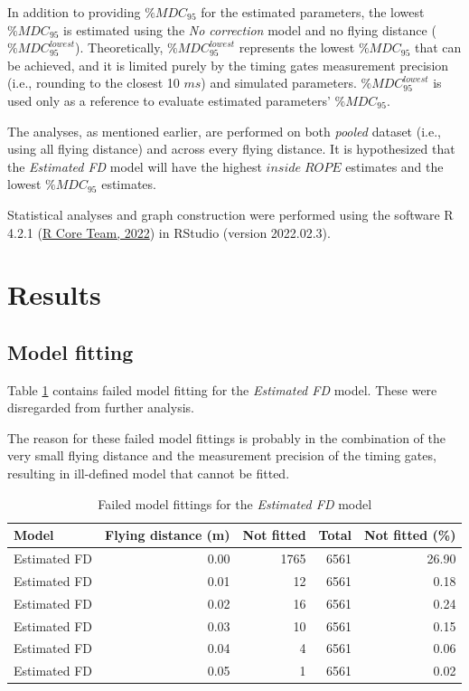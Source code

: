 \documentclass[fleqn,10pt]{wlpeerj} %
\begin{document}
In addition to providing \(\%MDC_{95}\) for the estimated parameters, the lowest \(\%MDC_{95}\) is estimated using the \emph{No correction} model and no flying distance (\(\%MDC_{95}^{lowest}\)). Theoretically, \(\%MDC_{95}^{lowest}\) represents the lowest \(\%MDC_{95}\) that can be achieved, and it is limited purely by the timing gates measurement precision (i.e., rounding to the closest 10 \(ms\)) and simulated parameters. \(\%MDC_{95}^{lowest}\) is used only as a reference to evaluate estimated parameters' \(\%MDC_{95}\).

The analyses, as mentioned earlier, are performed on both \emph{pooled} dataset (i.e., using all flying distance) and across every flying distance. It is hypothesized that the \emph{Estimated FD} model will have the highest \(inside \; ROPE\) estimates and the lowest \(\%MDC_{95}\) estimates.

Statistical analyses and graph construction were performed using the software R 4.2.1 (\protect\hyperlink{ref-R-base}{R Core Team, 2022}) in RStudio (version 2022.02.3).

\hypertarget{results}{%
\section{Results}\label{results}}

\hypertarget{model-fitting}{%
\subsection{Model fitting}\label{model-fitting}}

Table \ref{tab:tbl-not-fitted} contains failed model fitting for the \emph{Estimated FD} model. These were disregarded from further analysis.

The reason for these failed model fittings is probably in the combination of the very small flying distance and the measurement precision of the timing gates, resulting in ill-defined model that cannot be fitted.



\begin{table}

\caption{\label{tab:tbl-not-fitted}Failed model fittings for the \emph{Estimated FD} model}
\centering
\begin{tabular}[t]{lrrrr}
\toprule
Model & Flying distance (m) & Not fitted & Total & Not fitted (\%)\\
\midrule
Estimated FD & 0.00 & 1765 & 6561 & 26.90\\
Estimated FD & 0.01 & 12 & 6561 & 0.18\\
Estimated FD & 0.02 & 16 & 6561 & 0.24\\
Estimated FD & 0.03 & 10 & 6561 & 0.15\\
Estimated FD & 0.04 & 4 & 6561 & 0.06\\
\addlinespace
Estimated FD & 0.05 & 1 & 6561 & 0.02\\
\bottomrule
\end{tabular}
\end{table}
\end{document}
